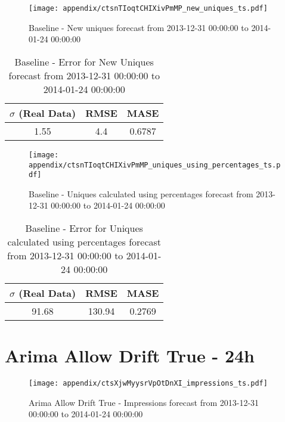 \begin{figure}[H] \begin{center} \leavevmode
\texttt{[image: appendix/ctsnTIoqtCHIXivPmMP\_new\_uniques\_ts.pdf]} \caption{
Baseline - New uniques forecast from 2013-12-31 00:00:00 to 2014-01-24 00:00:00} \label{fig:appendix/ctsnTIoqtCHIXivPmMP_new_uniques_ts.pdf} \end{center}
\end{figure}

\begin{table}[H]
\centering
\footnotesize
\begin{tabular}{ccc}
$\sigma$ (Real Data) & RMSE & MASE   \\ \hline
1.55 & 4.4 & 0.6787 \\
\end{tabular}

\vspace{0.5cm}

\caption{
Baseline - Error for New Uniques forecast from 2013-12-31 00:00:00 to 2014-01-24 00:00:00}
\end{table}

\begin{figure}[H] \begin{center} \leavevmode
\texttt{[image: appendix/ctsnTIoqtCHIXivPmMP\_uniques\_using\_percentages\_ts.pdf]} \caption{
Baseline - Uniques calculated using percentages forecast from 2013-12-31 00:00:00 to 2014-01-24 00:00:00} \label{fig:appendix/ctsnTIoqtCHIXivPmMP_uniques_using_percentages_ts.pdf} \end{center}
\end{figure}

\begin{table}[H]
\centering
\footnotesize
\begin{tabular}{ccc}
$\sigma$ (Real Data) & RMSE & MASE   \\ \hline
91.68 & 130.94 & 0.2769 \\
\end{tabular}

\vspace{0.5cm}

\caption{
Baseline - Error for Uniques calculated using percentages forecast from 2013-12-31 00:00:00 to 2014-01-24 00:00:00}
\end{table}

\section{Arima Allow Drift True - 24h}
\begin{figure}[H] \begin{center} \leavevmode
\texttt{[image: appendix/ctsXjwMyysrVpOtDnXI\_impressions\_ts.pdf]} \caption{
Arima Allow Drift True - Impressions forecast from 2013-12-31 00:00:00 to 2014-01-24 00:00:00} \label{fig:appendix/ctsXjwMyysrVpOtDnXI_impressions_ts.pdf} \end{center}
\end{figure}

